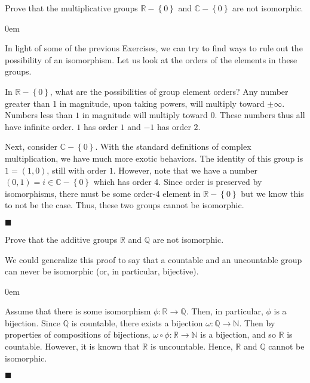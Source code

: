\documentclass[12pt]{article}
\renewcommand{\qed}{\hfill$\blacksquare$}
\renewenvironment{proof}{\begin{addmargin}[1em]{0em}\begin{newproof}}{\end{newproof}\end{addmargin}\qed}
\newenvironment{problem}[2][Exercise]{\begin{trivlist}
\item[\hskip \labelsep {\bfseries #1}\hskip \labelsep {\bfseries #2.}]}{\end{trivlist}}
\begin{document}
\begin{problem}{1.6.4}
Prove that the multiplicative groups $\mathbb{R}-\left\{0\right\}$ and $\mathbb{C}-\left\{0\right\}$ are not isomorphic.
\end{problem}
\begin{proof}
In light of some of the previous Exercises, we can try to find ways to rule out the possibility of an isomorphism. Let us look at the orders of the elements in these groups.

In $\mathbb{R}-\left\{0\right\}$, what are the possibilities of group element orders? Any number greater than 1 in magnitude, upon taking powers, will multiply toward $\pm \infty$. Numbers less than $1$ in magnitude will multiply toward $0$. These numbers thus all have infinite order. $1$ has order $1$ and $-1$ has order $2$.

Next, consider $\mathbb{C}-\left\{0\right\}$. With the standard definitions of complex multiplication, we have much more exotic behaviors. The identity of this group is $1= \left(1,0\right)$, still with order $1$. However, note that we have a number $\left(0,1\right)=i\in\mathbb{C}-\left\{0\right\}$ which has order 4. Since order is preserved by isomorphisms, there must be some order-4 element in $\mathbb{R}-\left\{0\right\}$ but we know this to not be the case. Thus, these two groups cannot be isomorphic.
\end{proof}


\begin{problem}{1.6.5}
Prove that the additive groups $\mathbb{R}$ and $\mathbb{Q}$ are not isomorphic.
\end{problem}
We could generalize this proof to say that a countable and an uncountable group can never be isomorphic (or, in particular, bijective). \\
\begin{proof}
Assume that there is some isomorphism $\phi:\mathbb{R}\rightarrow\mathbb{Q}$. Then, in particular, $\phi$ is a bijection. Since $\mathbb{Q}$ is countable, there exists a bijection $\omega:\mathbb{Q}\rightarrow \mathbb{N}$. Then by properties of compositions of bijections, $\omega \circ \phi:\mathbb{R}\rightarrow \mathbb{N}$ is a bijection, and so $\mathbb{R}$ is countable. However, it is known that $\mathbb{R}$ is uncountable. Hence, $\mathbb{R}$ and $\mathbb{Q}$ cannot be isomorphic.
\end{proof}
\end{document}
